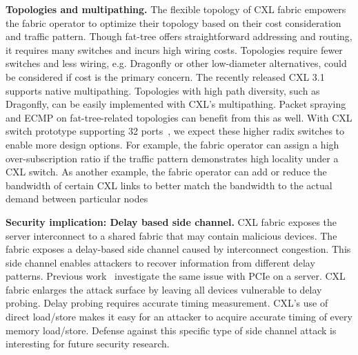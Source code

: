\noindent \textbf{Topologies and multipathing.}
The flexible topology of CXL fabric empowers the fabric operator to optimize their topology based on 
their cost consideration and traffic pattern.
%
Though fat-tree offers straightforward addressing and routing, it requires many switches and incurs high wiring costs. 
%
Topologies require fewer switches and less wiring, e.g. 
Dragonfly or other low-diameter alternatives, could be considered if cost is the primary concern.
%
The recently released CXL 3.1 supports native multipathing. 
%
Topologies with high path diversity, such as Dragonfly, can be easily implemented with CXL's multipathing. 
%
Packet spraying and ECMP on fat-tree-related topologies can benefit from this as well.
%
With CXL switch prototype supporting 32 ports~\cite{xconn-cxl2-switch}, we expect these higher radix switches to enable more design options.
%
For example, the fabric operator can assign a high over-subscription ratio if the traffic pattern demonstrates high locality under a CXL switch.
%
As another example, the fabric operator can add or reduce the bandwidth of certain CXL links to better match the bandwidth to the actual demand between particular nodes

\noindent \textbf{Security implication: Delay based side channel.}
CXL fabric exposes the server interconnect to a shared fabric that may contain malicious devices.
%
The fabric exposes a delay-based side channel caused by interconnect congestion.
%
This side channel enables attackers to recover information from different delay patterns. 
%
Previous work~\cite{invisible-probe:oaklnad:2021} investigate the same issue with PCIe on a server. 
%
CXL fabric enlarges the attack surface by leaving all devices vulnerable to delay probing.
%
Delay probing requires accurate timing measurement.
%
CXL's use of direct load/store makes it easy for an attacker to acquire accurate timing of every memory load/store.
%
Defense against this specific type of side channel attack is interesting for future security research. 
%

%
%

